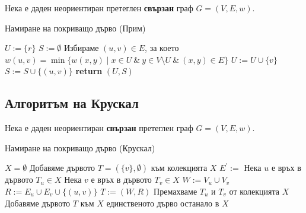 Нека е даден неориентиран претеглен {\bf свързан} граф $G = (V,E,w)$.

\begin{algorithm}[H]
  \caption{Намиране на покриващо дърво (Прим)}

  \begin{algorithmic}[1]
    \State $U := \{r\}$
    \State $S := \emptyset$
    \State Избираме $(u,v) \in E$, за което
    \State $w(u,v) = \min\{w(x,y) \mid x\in U\ \&\ y \in V\setminus U\ \&\ (x,y) \in E\}$
    \State $U := U\cup\{v\}$
    \State $S := S \cup\{(u,v)\}$
    \EndWhile
    \State \textbf{return} $(U,S)$
    \EndProcedure
  \end{algorithmic}
\end{algorithm}


\subsection{Алгоритъм на Крускал}

Нека е даден неориентиран {\bf свързан} претеглен граф $G = (V,E,w)$.

\begin{algorithm}[h!]
  \caption{Намиране на покриващо дърво (Крускал)}
  
  \begin{algorithmic}[1]
    \State $X = \emptyset$
    \State Добавяме дървото $T = (\{v\},\emptyset)$ към колекцията $X$
    \EndFor
    \State$E^\prime := $
    \Statex
    \State Нека $u$ е връх в дървото $T_u \in X$
    \State Нека $v$ е връх в дървото $T_v \in X$
    \State $W := V_u\cup V_v$
    \State $R := E_u\cup E_v\cup\{(u,v)\}$
    \State $T := (W,R)$
    \State Премахваме $T_u$ и $T_v$ от колекцията $X$
    \State Добавяме дървото $T$ към $X$
    \EndIf
    \EndFor
    \State \Return единственото дърво останало в $X$
    \EndProcedure
  \end{algorithmic}
\end{algorithm}

